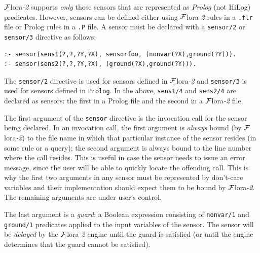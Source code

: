 \documentclass[11pt]{article}
\newcommand{\FLORA}{{\mbox{\sc ${\cal F}${lora}\rm\emph{-2}}}\xspace}
\begin{document}
\FLORA supports \emph{only} those sensors that are represented as
\emph{Prolog} (not HiLog) predicates. However, sensors can be defined
either using \FLORA rules in a \texttt{.flr} file or Prolog rules in a
\texttt{.P} file.  A sensor must be declared with a \texttt{sensor/2} or
\texttt{sensor/3} directive as follows:
\begin{verbatim}
:- sensor(sens1(?,?,?Y,?X), sensorfoo, (nonvar(?X),ground(?Y))).
:- sensor(sens2(?,?,?Y,?X), (ground(?X),ground(?Y))).
\end{verbatim}
The \texttt{sensor/2} directive is used for sensors defined in \FLORA and
\texttt{sensor/3} is used for sensors defined in \texttt{Prolog}.  In the
above, \texttt{sens1/4} and \texttt{sens2/4} are declared as sensors: the
first in a Prolog file and the second in a \FLORA file.

The first argument of the \texttt{sensor} directive is the invocation call for the sensor
being declared.
In an invocation call, the first argument is \emph{always} bound (by
\FLORA) to the
file name in which that particular instance of the sensor resides (in some
rule or a query); the
second argument is always bound to the line number where the call
resides. This is useful in case the sensor needs to issue an error
message, since the user will be able to quickly locate the offending call. 
This is why the first two arguments in any sensor must be represented by
don't-care variables and their implementation should expect them to be bound
by \FLORA.
The remaining arguments are under user's control.

The last argument is a \emph{guard}: a Boolean expression consisting of
\texttt{nonvar/1} and \texttt{ground/1} predicates applied to the input
variables of the sensor. The sensor will be \emph{delayed} by the \FLORA engine until the
guard is satisfied (or until the engine determines that the guard cannot be
satisfied).
\end{document}
